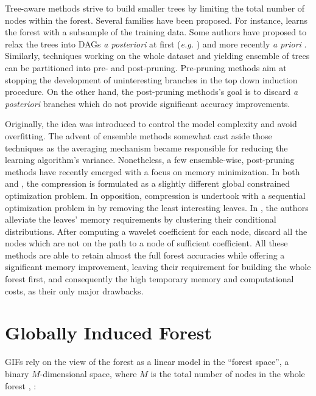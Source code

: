 \documentclass{article}
\begin{document}
Tree-aware methods strive to build smaller trees by limiting the total number 
of nodes within the forest. Several families have been proposed. For instance, 
\citet{breiman1999pasting} learns the forest with a subsample of the training 
data. Some authors have proposed to relax the trees into DAGs {\it a 
posteriori} at first ({\it e.g.} \cite{peterson2009dag}) and more recently {\it 
a priori} \cite{shotton2013jungle}. 
Similarly, techniques working on the whole dataset and yielding ensemble of 
trees can be partitioned into pre- and post-pruning. Pre-pruning methods aim at 
stopping the development of uninteresting branches in the top down induction 
procedure. On the other hand, the post-pruning methods's goal is to discard 
{\it a posteriori} branches which do not provide significant accuracy 
improvements.

Originally, the idea was introduced to control the model complexity and avoid 
overfitting. The advent of ensemble methods somewhat cast aside those 
techniques as the averaging mechanism became responsible for reducing the 
learning algorithm's variance. Nonetheless, a few ensemble-wise, post-pruning 
methods have recently emerged with a focus on memory minimization. In both 
\cite{meinshausen2009forestgarrote} and \cite{l1basedcomp}, the compression 
is formulated as a slightly different global constrained optimization problem. 
In opposition, compression is undertook with a sequential optimization problem 
in \cite{ren2015glorefinement} by removing the least interesting leaves.
In \cite{vleeschouwer2015mitimemreq}, the authors alleviate the leaves' memory 
requirements by clustering their conditional distributions. After computing a 
wavelet coefficient for each node, \citet{elisha2016wavelet} discard all the 
nodes which are not on the path to a node of sufficient coefficient.
All these methods are able to retain almost the full forest accuracies while 
offering a significant memory improvement, leaving their requirement for 
building the whole forest first, and consequently the high temporary memory and 
computational costs, as their only major drawbacks.





\section{Globally Induced Forest}
\label{sec:gif}

GIFs rely on the view of the forest as a linear model in the ``forest space'', 
a binary $M$-dimensional space, where $M$ is the total number of nodes in the 
whole forest \cite{l1basedcomp}, \cite{vens2011random}:
\end{document}
